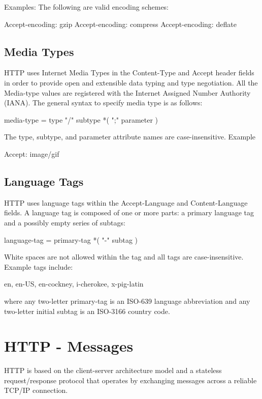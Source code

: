 \documentclass[a4paper,11pt,bahasa]{extarticle}
\begin{document}
Examples: The following are valid encoding schemes:
\begin{textcode}
Accept-encoding: gzip
Accept-encoding: compress
Accept-encoding: deflate
\end{textcode}

\subsection{Media Types}

HTTP uses Internet Media Types in the Content-Type and Accept header fields in order to
provide open and extensible data typing and type negotiation. All the Media-type values
are registered with the Internet Assigned Number Authority (IANA). The general syntax to
specify media type is as follows:
\begin{textcode}
media-type     = type "/" subtype *( ";" parameter )
\end{textcode}
The type, subtype, and parameter attribute names are case-insensitive. Example
\begin{textcode}
Accept: image/gif
\end{textcode}

\subsection{Language Tags}
HTTP uses language tags within the Accept-Language and Content-Language fields. A language tag is 
composed of one or more parts: a primary language tag and a possibly empty series of subtags:
\begin{textcode}
language-tag  = primary-tag *( "-" subtag )
\end{textcode}
White spaces are not allowed within the tag and all tags are case-insensitive.
Example tags include:
\begin{textcode}
en, en-US, en-cockney, i-cherokee, x-pig-latin
\end{textcode}
where any two-letter primary-tag is an ISO-639 language abbreviation and any two-letter initial subtag 
is an ISO-3166 country code.


\section{HTTP - Messages}

HTTP is based on the client-server architecture model and a stateless request/response protocol that 
operates by exchanging messages across a reliable TCP/IP connection.
\end{document}
